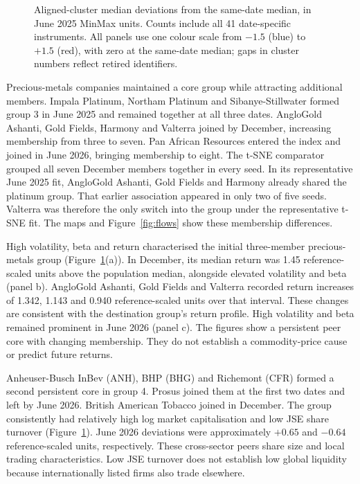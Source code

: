 \begin{figure}[htbp]
\centering
{}\par\medskip
{}\par\medskip
{}
\caption{Aligned-cluster median deviations from the same-date median, in June 2025 MinMax units. Counts include all 41 date-specific instruments. All panels use one colour scale from $-1.5$ (blue) to $+1.5$ (red), with zero at the same-date median; gaps in cluster numbers reflect retired identifiers.}\label{fig:profiles}
\end{figure}

\FloatBarrier

Precious-metals companies maintained a core group while attracting additional members. Impala Platinum, Northam Platinum and Sibanye-Stillwater formed group 3 in June 2025 and remained together at all three dates. AngloGold Ashanti, Gold Fields, Harmony and Valterra joined by December, increasing membership from three to seven. Pan African Resources entered the index and joined in June 2026, bringing membership to eight. The t-SNE comparator grouped all seven December members together in every seed. In its representative June 2025 fit, AngloGold Ashanti, Gold Fields and Harmony already shared the platinum group. That earlier association appeared in only two of five seeds. Valterra was therefore the only switch into the group under the representative t-SNE fit. The maps and Figure~\ref{fig:flows} show these membership differences.

High volatility, beta and return characterised the initial three-member precious-metals group (Figure~\ref{fig:profiles}(a)). In December, its median return was 1.45 reference-scaled units above the population median, alongside elevated volatility and beta (panel b). AngloGold Ashanti, Gold Fields and Valterra recorded return increases of 1.342, 1.143 and 0.940 reference-scaled units over that interval. These changes are consistent with the destination group's return profile. High volatility and beta remained prominent in June 2026 (panel c). The figures show a persistent peer core with changing membership. They do not establish a commodity-price cause or predict future returns.

Anheuser-Busch InBev (ANH), BHP (BHG) and Richemont (CFR) formed a second persistent core in group 4. Prosus joined them at the first two dates and left by June 2026. British American Tobacco joined in December. The group consistently had relatively high log market capitalisation and low JSE share turnover (Figure~\ref{fig:profiles}). June 2026 deviations were approximately $+0.65$ and $-0.64$ reference-scaled units, respectively. These cross-sector peers share size and local trading characteristics. Low JSE turnover does not establish low global liquidity because internationally listed firms also trade elsewhere.

